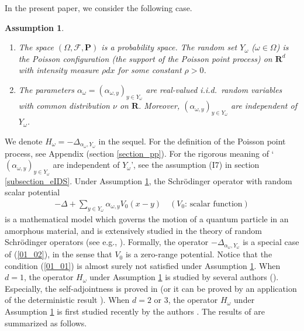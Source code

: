\documentclass[12pt,a4paper]{article}
\newtheorem{assumption}[theorem]{Assumption}
\begin{document}
In the present paper, 
we consider the following case.
\begin{assumption}
\label{assumption_PA}
\begin{enumerate}
 \item 
The space $(\Omega,\mathcal{F},\mathbf{P})$ is a probability space.
The random set $Y_\omega$ ($\omega\in \Omega$) is the Poisson configuration
(the support of the Poisson point process) on $\mathbf{R}^d$
with intensity measure $\rho dx$ for some constant $\rho>0$.

 \item The parameters $\alpha_\omega=(\alpha_{\omega,y})_{y\in Y_\omega}$
are real-valued i.i.d.\ random variables
with common distribution $\nu$ on $\mathbf{R}$.
Moreover, $(\alpha_{\omega,y})_{y\in Y_\omega}$ 
are independent of $Y_\omega$.
\end{enumerate}
\end{assumption}
\noindent
We denote $H_\omega = -\Delta_{\alpha_\omega, Y_\omega}$ in the sequel.
For the definition of the Poisson point process,
see Appendix (section \ref{section_pp}).
For the rigorous meaning of 
`$(\alpha_{\omega,y})_{y\in Y_\omega}$ 
are independent of $Y_\omega$',
see the assumption (I7) in section \ref{subsection_eIDS}.
Under Assumption \ref{assumption_PA},
the Schr\"odinger operator with random scalar potential
\begin{align}
\label{01_02}
 -\Delta + \sum_{y\in Y_\omega}\alpha_{\omega,y}V_0(x-y)
\quad (\mbox{$V_0$: scalar function})
\end{align}
is a mathematical model which governs the motion of a quantum particle in an amorphous material,
and is extensively studied in the theory of random Schr\"odinger
operators (see e.g., \cite{Ca-La,Pa-Fi}).
Formally, 
the operator $-\Delta_{\alpha_\omega, Y_\omega}$
is a special case
of (\ref{01_02}), in the sense that $V_0$ is a zero-range potential.
Notice that the condition (\ref{01_01}) is almost surely not satisfied under
Assumption \ref{assumption_PA}.
When $d=1$, 
the operator $H_\omega$ 
under Assumption \ref{assumption_PA}
is  studied by several authors
(\cite{Fr-Ll,Lu-Sy, Ko, Minami}).
Especially, the self-adjointness is proved in \cite{Minami}
(or it can be proved by an application of 
the deterministic result \cite{Ko-Ma}).
When $d=2$ or $3$, 
the operator $H_\omega$ under Assumption \ref{assumption_PA}
 is first studied recently by the authors \cite{Ka-Mi-Na}.
The results of \cite{Ka-Mi-Na} are summarized as follows.
\end{document}
